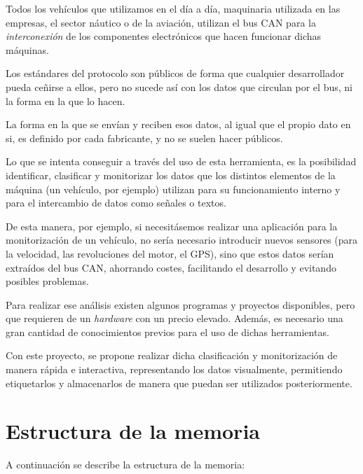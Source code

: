 
Todos los vehículos que utilizamos en el día a día, maquinaria utilizada en las empresas, el sector náutico o de la aviación, utilizan el bus CAN para la \emph{interconexión} de los componentes electrónicos que hacen funcionar dichas máquinas.

Los estándares del protocolo son públicos de forma que cualquier desarrollador pueda ceñirse a ellos, pero no sucede así con los datos que circulan por el bus, ni la forma en la que lo hacen.

La forma en la que se envían y reciben esos datos, al igual que el propio dato en si, es definido por cada fabricante, y no se suelen hacer públicos.

Lo que se intenta conseguir a través del uso de esta herramienta, es la posibilidad identificar, clasificar y monitorizar los datos que los distintos elementos de la máquina (un vehículo, por ejemplo) utilizan para su funcionamiento interno y para el intercambio de datos como señales o textos.

De esta manera, por ejemplo, si necesitásemos realizar una aplicación para la monitorización de un vehículo, no sería necesario introducir nuevos sensores (para la velocidad, las revoluciones del motor, el GPS), sino que estos datos serían extraídos del bus CAN, ahorrando costes, facilitando el desarrollo y evitando posibles problemas.


Para realizar ese análisis existen algunos programas y proyectos disponibles, pero que requieren de un \emph{hardware} con un precio elevado. Además, es necesario una gran cantidad de conocimientos previos para el uso de dichas herramientas.

Con este proyecto, se propone realizar dicha clasificación y monitorización de manera rápida e interactiva, representando los datos visualmente, permitiendo etiquetarlos y almacenarlos de manera que puedan ser utilizados posteriormente.

\section{Estructura de la memoria}\label{estructura-de-la-memoria}

A continuación se describe la estructura de la memoria:


